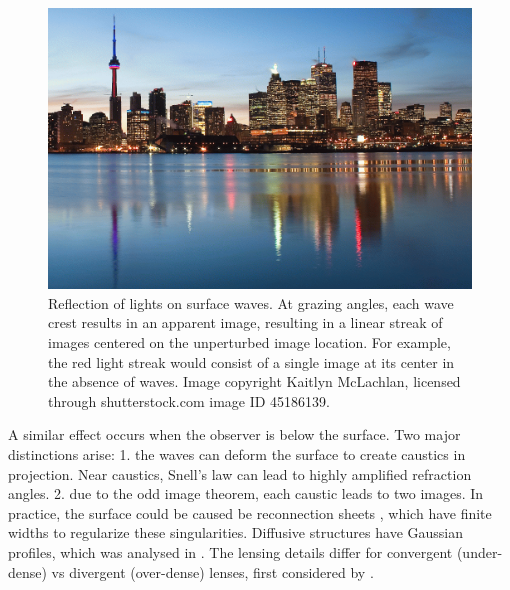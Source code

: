 \documentclass[useAMS,usenatbib]{mn2e}
\begin{document}
\begin{figure}
\centering
\includegraphics[width=1.0\linewidth, angle=0]{toronto-skyline.png}
\caption{Reflection of lights on surface waves.  At grazing angles,
 each wave crest results in an apparent image, resulting in a linear
 streak of images centered on the unperturbed image location.  For
 example, the red light streak would consist of a single image at its
 center in the absence of waves. Image copyright Kaitlyn McLachlan,
 licensed through shutterstock.com image ID 45186139.}
\label{fig:water_reflection}
\end{figure}


A similar effect occurs when the
observer is below the surface.  Two major distinctions arise: 1. the
waves can deform the surface to create caustics in projection. Near
caustics, Snell's law can lead to highly amplified refraction
angles.  2. due to the odd image theorem, each caustic leads to two
images.  In practice, the surface could be caused be reconnection
sheets \citep{2015MNRAS.450.3201B}, which have finite widths to
regularize these singularities. Diffusive structures have Gaussian
profiles, which was analysed in \citet{2012MNRAS.421L.132P}.  The
lensing details differ for convergent (under-dense) vs divergent
(over-dense) lenses, first considered by \citet{1998ApJ...496..253C}.
\end{document}
